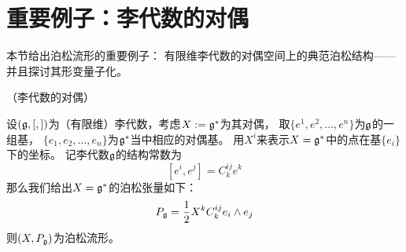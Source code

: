 








\section{重要例子：李代数的对偶}

本节给出泊松流形的重要例子：
有限维李代数的对偶空间上的典范泊松结构——
并且探讨其形变量子化。

\begin{Example}（李代数的对偶）
\label{李代数的对偶空间的泊松结构-example}

设$(\mathfrak{g},[,])$为（有限维）李代数，考虑$X:=\mathfrak{g}^*$为其对偶，
取$\{e^1,e^2,...,e^n\}$为$\mathfrak{g}$的一组基，
$\{e_1,e_2,...,e_n\}$为$\mathfrak{g}^*$当中相应的对偶基。
用$X^i$来表示$X=\mathfrak{g}^*$中的点在基$\{e_i\}$下的坐标。
记李代数$\mathfrak{g}$的结构常数为
$$[e^i,e^j]=C^{ij}_ke^k$$
那么我们给出$X=\mathfrak{g}^*$的泊松张量如下：
$$P_{\mathfrak{g}}=\frac{1}{2}X^kC^{ij}_ke_i\wedge e_j$$
则$(X,P_{\mathfrak{g}})$为泊松流形。


\end{Example}

